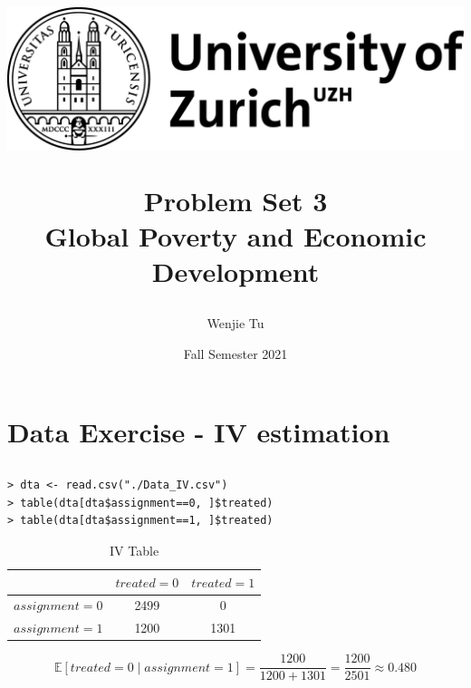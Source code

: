 \documentclass[a4paper]{article}
\title{%
\begin{center}
    \includegraphics[scale=0.1]{UZH2.png}
\end{center}
    Problem Set 3 \\
    \vspace{1mm}
    \large Global Poverty and Economic Development
}
\author{Wenjie Tu}
\date{Fall Semester 2021}
\begin{document}
\maketitle

\section{Data Exercise - IV estimation}

\subsection{}

\begin{verbatim}
> dta <- read.csv("./Data_IV.csv")
> table(dta[dta$assignment==0, ]$treated)
> table(dta[dta$assignment==1, ]$treated)
\end{verbatim}

\begin{table}[!htbp] \centering
    \caption{IV Table}
    \label{tab:counts}
    \vspace{1mm}
    \begin{tabular}{lcc}
    \hline\hline
    \vspace{1mm}
           & $treated=0$ & $treated=1$ \\
    \hline
    $assignment=0$ & 2499 &  0   \\
    $assignment=1$ & 1200 & 1301 \\
    \hline\hline
    \end{tabular}
\end{table}

\begin{equation*}
    \mathbb{E}[treated=0\mid assignment=1]=
    \frac{1200}{1200+1301}=\frac{1200}{2501}\approx0.480
\end{equation*}
\end{document}
